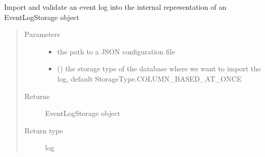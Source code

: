 \documentclass[letterpaper,10pt,english]{sphinxmanual}
\begin{document}

\begin{fulllineitems}
\label{\detokenize{event_log_analyzer:event_log_analyzer.importer.import_event_log}}
\sphinxAtStartPar
Import and validate an event log into the internal representation of an EventLogStorage object
\begin{quote}\begin{description}
\item[{Parameters}] \leavevmode\begin{itemize}
\item {} 
\sphinxAtStartPar
{} \textendash{} the path to a JSON configuration file

\item {} 
\sphinxAtStartPar
{} ({\hyperref[\detokenize{event_log_analyzer:event_log_analyzer.event_log.StorageType}]{}}) \textendash{} the storage type of the database where we want to import the log, default StorageType.COLUMN\_BASED\_AT\_ONCE

\end{itemize}

\item[{Returns}] \leavevmode
\sphinxAtStartPar
EventLogStorage object

\item[{Return type}] \leavevmode
\sphinxAtStartPar
log

\end{description}\end{quote}

\end{fulllineitems}

\end{document}

